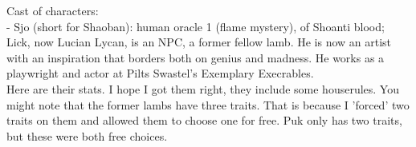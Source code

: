 Cast of characters:\\

- Sjo (short for Shaoban): human oracle 1 (flame mystery), of Shoanti blood;   Lick, now Lucian Lycan, is an NPC, a former fellow lamb. He is now an artist with an inspiration that borders both on genius and madness. He works as a playwright and actor at Pilts Swastel's Exemplary Execrables.\\

Here are their stats. I hope I got them right, they include some houserules. You might note that the former lambs have three traits. That is because I 'forced' two traits on them and allowed them to choose one for free. Puk only has two traits, but these were both free choices.\\

